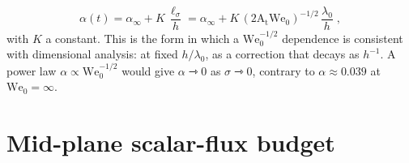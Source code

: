 \documentclass[lineno]{jfm}
\newcommand{\At}{\mathrm{A_t}}
\newcommand{\We}{\mathrm{We}_0}
\newcommand{\lls}{\ell_\sigma}
\begin{document}
\begin{equation}
  \alpha(t) = \alpha_\infty + K \, \frac{\lls}{h} = \alpha_\infty + K \,(2 \At \We)^{-1/2} \, \frac{\lambda_0}{h} \;,
  \label{eq:capvel}
\end{equation}
with $K$ a constant. This is the form in which a $\We^{-1/2}$ dependence is consistent with dimensional analysis: at fixed $h/\lambda_0$, as a correction that decays as $h^{-1}$. A power law $\alpha \propto \We^{-1/2}$ would give $\alpha \rightarrowtriangle 0$ as $\sigma \rightarrowtriangle 0$, contrary to $\alpha \approx 0.039$ at $\We = \infty$.

\section{Mid-plane scalar-flux budget}\label{sec:flux}
\end{document}
